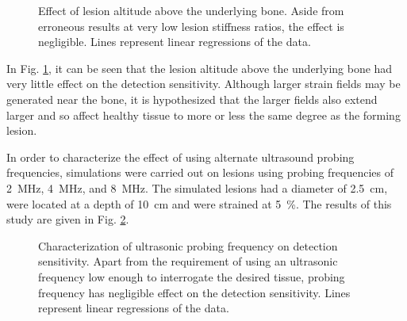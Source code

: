 			\begin{figure}[!htb]
				\centering
				\caption[Quasi-static lesion altitude characterization]{Effect of lesion altitude above the underlying bone. Aside from erroneous results at very low lesion stiffness ratios, the effect is negligible. Lines represent linear regressions of the data.}
				\label{fig:bottomsep_characterization}
			\end{figure}

			In Fig. \ref{fig:bottomsep_characterization}, it can be seen that the lesion altitude above the underlying bone had very little effect on the detection sensitivity. Although larger strain fields may be generated near the bone, it is hypothesized that the larger fields also extend larger and so affect healthy tissue to more or less the same degree as the forming lesion.

			In order to characterize the effect of using alternate ultrasound probing frequencies, simulations were carried out on lesions using probing frequencies of \SI{2}{\MHz}, \SI{4}{\MHz}, and \SI{8}{\MHz}. The simulated lesions had a diameter of \SI{2.5}{\cm}, were located at a depth of \SI{10}{\cm} and were strained at \SI{5}{\percent}. The results of this study are given in Fig. \ref{fig:freq_characterization}.

			\begin{figure}[!htb]
				\centering
				\caption[Quasi-static ultrasound probing frequency characterization]{Characterization of ultrasonic probing frequency on detection sensitivity. Apart from the requirement of using an ultrasonic frequency low enough to interrogate the desired tissue, probing frequency has negligible effect on the detection sensitivity. Lines represent linear regressions of the data.}
				\label{fig:freq_characterization}
			\end{figure}

